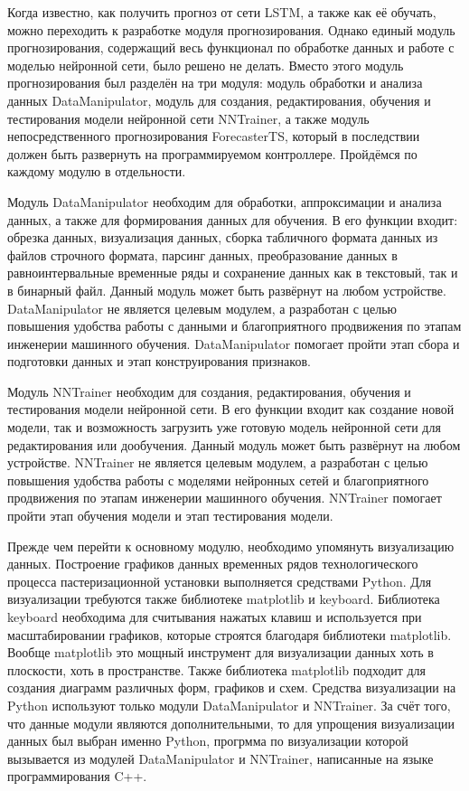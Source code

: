{\gostFont

  \par \redline Когда известно, как получить прогноз от сети LSTM, а также как её обучать, можно переходить к разработке модуля прогнозирования. Однако единый модуль прогнозирования, содержащий весь функционал по обработке данных и работе с моделью нейронной сети, было решено не делать. Вместо этого модуль прогнозирования был разделён на три модуля: модуль обработки и анализа данных DataManipulator, модуль для создания, редактирования, обучения и тестирования модели нейронной сети NNTrainer, а также модуль непосредственного прогнозирования ForecasterTS, который в последствии должен быть развернуть на программируемом контроллере. Пройдёмся по каждому модулю в отдельности. 

  \par \redline Модуль DataManipulator необходим для обработки, аппроксимации и анализа данных, а также для формирования данных для обучения. В его функции входит: обрезка данных, визуализация данных, сборка табличного формата данных из файлов строчного формата, парсинг данных, преобразование данных в равноинтервальные временные ряды и сохранение данных как в текстовый, так и в бинарный файл. Данный модуль может быть развёрнут на любом устройстве. DataManipulator не является целевым модулем, а разработан с целью повышения удобства работы с данными и благоприятного продвижения по этапам инженерии машинного обучения. DataManipulator помогает пройти этап сбора и подготовки данных и этап конструирования признаков. 

  \par \redline Модуль NNTrainer необходим для создания, редактирования, обучения и тестирования модели нейронной сети. В его функции входит как создание новой модели, так и возможность загрузить уже готовую модель нейронной сети для редактирования или дообучения. Данный модуль может быть развёрнут на любом устройстве. NNTrainer не является целевым модулем, а разработан с целью повышения удобства работы с моделями нейронных сетей и благоприятного продвижения по этапам инженерии машинного обучения. NNTrainer помогает пройти этап обучения модели и этап тестирования модели.
  
  \par \redline Прежде чем перейти к основному модулю, необходимо упомянуть визуализацию данных. Построение графиков данных временных рядов технологического процесса пастеризационной установки выполняется средствами Python. Для визуализации требуются также библиотеке matplotlib и keyboard. Библиотека keyboard необходима для считывания нажатых клавиш и используется при масштабировании графиков, которые строятся благодаря библиотеки matplotlib. Вообще matplotlib это мощный инструмент для визуализации данных хоть в плоскости, хоть в пространстве. Также библиотека matplotlib подходит для создания диаграмм различных форм, графиков и схем. Средства визуализации на Python используют только модули DataManipulator и NNTrainer. За счёт того, что данные модули являются дополнительными, то для упрощения визуализации данных был выбран именно Python, прогрмма по визуализации которой вызывается из модулей DataManipulator и NNTrainer, написанные на языке программирования C++.

}
